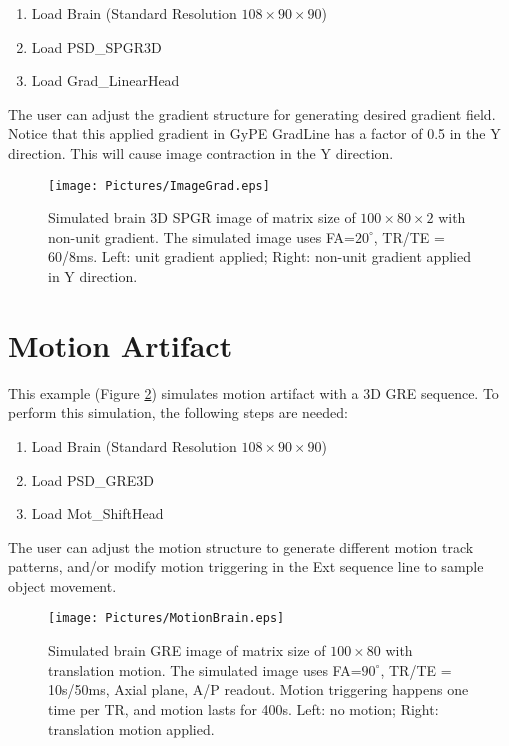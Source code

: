 \documentclass{book}%
\begin{document}
\begin{enumerate}
	\item Load Brain (Standard Resolution $108 \times 90 \times 90$)
  \item Load PSD\_SPGR3D
	\item Load Grad\_LinearHead
\end{enumerate}

The user can adjust the gradient structure for generating desired gradient field. Notice that this applied gradient in GyPE GradLine has a factor of 0.5 in the Y direction. This will cause image contraction in the Y direction.

\begin{figure}[htbp]
	\centering
		\texttt{[image: Pictures/ImageGrad.eps]}
	\caption{Simulated brain 3D SPGR image of matrix size of $100 \times 80 \times 2$ with non-unit gradient. The simulated image uses FA=$20^{\circ}$, TR/TE = 60/8ms. Left: unit gradient applied; Right: non-unit gradient applied in Y direction.}
	\label{fig:ImageGrad}
\end{figure}

\section{Motion Artifact}

This example (Figure \ref{fig:MotionBrain}) simulates motion artifact with a 3D GRE sequence. To perform this simulation, the following steps are needed:

\begin{enumerate}
	\item Load Brain (Standard Resolution $108 \times 90 \times 90$)
  \item Load PSD\_GRE3D
	\item Load Mot\_ShiftHead
\end{enumerate}

The user can adjust the motion structure to generate different motion track patterns, and/or modify motion triggering in the Ext sequence line to sample object movement.

\begin{figure}[htbp]
	\centering
		\texttt{[image: Pictures/MotionBrain.eps]}
	\caption{Simulated brain GRE image of matrix size of $100 \times 80$ with translation motion. The simulated image uses FA=$90^{\circ}$, TR/TE = 10s/50ms, Axial plane, A/P readout. Motion triggering happens one time per TR, and motion lasts for 400s. Left: no motion; Right: translation motion applied.}
	\label{fig:MotionBrain}
\end{figure}
\end{document}
